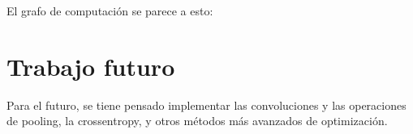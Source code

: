 \documentclass{article}
\begin{document}
El grafo de computación se parece a esto:

\begin{figure}[h!]
	\centering
	
\end{figure}

\section{Trabajo futuro}

Para el futuro, se tiene pensado
implementar las convoluciones y las operaciones de pooling,
la crossentropy, y otros métodos más avanzados de optimización.
\end{document}
